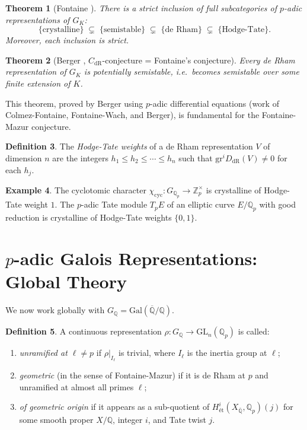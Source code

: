 \documentclass[12pt,a4paper]{amsart}
\newtheorem{theorem}{Theorem}[section]
\theoremstyle{definition}
\newtheorem{definition}[theorem]{Definition}
\newtheorem{example}[theorem]{Example}
\theoremstyle{remark}
\newcommand{\Gal}{\mathrm{Gal}}
\newcommand{\GL}{\mathrm{GL}}
\newcommand{\Qp}{\mathbb{Q}_p}
\newcommand{\Zp}{\mathbb{Z}_p}
\newcommand{\Qbar}{\overline{\mathbb{Q}}}
\newcommand{\GQ}{G_{\mathbb{Q}}}
\newcommand{\DdR}{D_{\mathrm{dR}}}
\newcommand{\Q}{\mathbb{Q}}
\begin{document}
\begin{theorem}[Fontaine {\cite[Theorem A]{Fontaine1994}}]
  There is a strict inclusion of full subcategories of $p$-adic representations of $G_K$:
  \[
    \{ \text{crystalline} \} \;\subsetneq\; \{ \text{semistable} \} \;\subsetneq\;
    \{ \text{de Rham} \} \;\subsetneq\; \{ \text{Hodge-Tate} \}.
  \]
  Moreover, each inclusion is strict.
\end{theorem}

\begin{theorem}[Berger \cite{Berger2002}, $C_{\mathrm{dR}}$-conjecture = Fontaine's conjecture]
  Every de Rham representation of $G_K$ is potentially semistable, i.e.\ becomes
  semistable over some finite extension of $K$.
\end{theorem}

This theorem, proved by Berger \cite{Berger2002} using $p$-adic differential equations
(work of Colmez-Fontaine, Fontaine-Wach, and Berger), is fundamental for the Fontaine-Mazur
conjecture.

\begin{definition}
  The \emph{Hodge-Tate weights} of a de Rham representation $V$ of dimension $n$ are
  the integers $h_1 \leq h_2 \leq \cdots \leq h_n$ such that
  $\mathrm{gr}^i \DdR(V) \neq 0$ for each $h_j$.
\end{definition}

\begin{example}
  The cyclotomic character $\chi_{\mathrm{cyc}}\colon G_{\Qp} \to \Zp^\times$ is
  crystalline of Hodge-Tate weight $1$. The $p$-adic Tate module $T_p E$ of an elliptic
  curve $E/\Q_p$ with good reduction is crystalline of Hodge-Tate weights $\{0, 1\}$.
\end{example}

\section{$p$-adic Galois Representations: Global Theory}\label{sec:galrep}

We now work globally with $\GQ = \Gal(\Qbar/\Q)$.

\begin{definition}
  A continuous representation
  $\rho\colon \GQ \to \GL_n(\Qp)$
  is called:
  \begin{enumerate}[label=(\roman*)]
    \item \emph{unramified at $\ell \neq p$} if $\rho|_{I_\ell}$ is trivial, where
      $I_\ell$ is the inertia group at $\ell$;
    \item \emph{geometric} (in the sense of Fontaine-Mazur) if it is de Rham at $p$
      and unramified at almost all primes $\ell$;
    \item \emph{of geometric origin} if it appears as a sub-quotient of
      $H^i_{\text{\'et}}(X_{\Qbar}, \Qp)(j)$ for some smooth proper $X/\Q$, integer $i$,
      and Tate twist $j$.
  \end{enumerate}
\end{definition}
\end{document}
